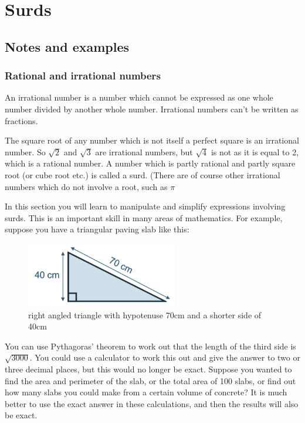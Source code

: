 \documentclass[
]{article}
\author{}
\date{\vspace{-2.5em}}
\begin{document}
\hypertarget{surds}{%
\section{Surds}\label{surds}}

\hypertarget{notes-and-examples}{%
\subsection{Notes and examples}\label{notes-and-examples}}

\hypertarget{rational-and-irrational-numbers}{%
\subsubsection{Rational and irrational
numbers}\label{rational-and-irrational-numbers}}

An irrational number is a number which cannot be expressed as one whole
number divided by another whole number. Irrational numbers can't be
written as fractions.

The square root of any number which is not itself a perfect square is an
irrational number. So \(\sqrt{2}\) and \(\sqrt{3}\) are irrational
numbers, but \(\sqrt{4}\) is not as it is equal to 2, which is a
rational number. A number which is partly rational and partly square
root (or cube root etc.) is called a surd. (There are of course other
irrational numbers which do not involve a root, such as \(\pi\)

In this section you will learn to manipulate and simplify expressions
involving surds. This is an important skill in many areas of
mathematics. For example, suppose you have a triangular paving slab like
this:

\begin{figure}
\centering
\includegraphics[width=2.60417in,height=\textheight]{images/Picture.png}
\caption{right angled triangle with hypotenuse 70cm and a shorter side
of 40cm}
\end{figure}

You can use Pythagoras' theorem to work out that the length of the third
side is \(\sqrt{3000}\). You could use a calculator to work this out and
give the answer to two or three decimal places, but this would no longer
be exact. Suppose you wanted to find the area and perimeter of the slab,
or the total area of 100 slabs, or find out how many slabs you could
make from a certain volume of concrete? It is much better to use the
exact answer in these calculations, and then the results will also be
exact.
\end{document}
